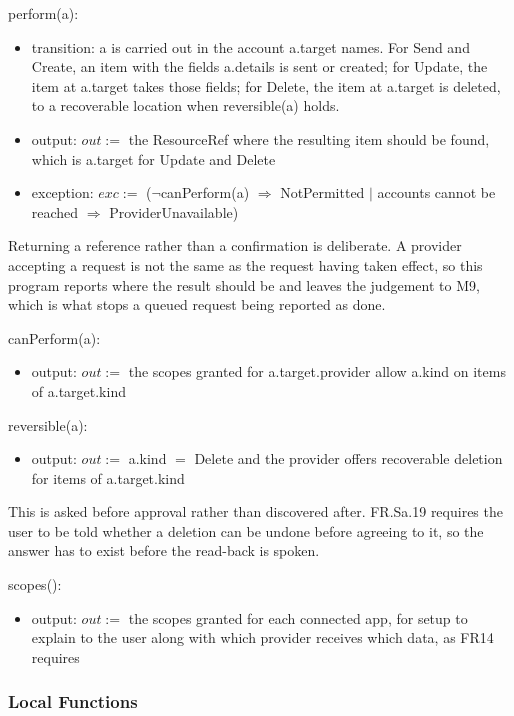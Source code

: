 \documentclass[12pt, titlepage]{article}
\begin{document}
\noindent perform(a):
\begin{itemize}
\item transition: a is carried out in the account a.target names. For Send and
Create, an item with the fields a.details is sent or created; for Update, the
item at a.target takes those fields; for Delete, the item at a.target is
deleted, to a recoverable location when reversible(a) holds.
\item output: $out :=$ the ResourceRef where the resulting item should be found,
which is a.target for Update and Delete
\item exception: $exc :=$ ($\lnot$canPerform(a) $\Rightarrow$ NotPermitted $|$
accounts cannot be reached $\Rightarrow$ ProviderUnavailable)
\end{itemize}

\noindent Returning a reference rather than a confirmation is deliberate. A
provider accepting a request is not the same as the request having taken
effect, so this program reports where the result should be and leaves the
judgement to M9, which is what stops a queued request being reported as done.

\noindent canPerform(a):
\begin{itemize}
\item output: $out :=$ the scopes granted for a.target.provider allow a.kind on
items of a.target.kind
\end{itemize}

\noindent reversible(a):
\begin{itemize}
\item output: $out :=$ a.kind $=$ Delete and the provider offers recoverable
deletion for items of a.target.kind
\end{itemize}

\noindent This is asked before approval rather than discovered after. FR.Sa.19
requires the user to be told whether a deletion can be undone before agreeing to
it, so the answer has to exist before the read-back is spoken.

\noindent scopes():
\begin{itemize}
\item output: $out :=$ the scopes granted for each connected app, for setup to
explain to the user along with which provider receives which data, as FR14
requires
\end{itemize}

\subsubsection{Local Functions}
\end{document}
